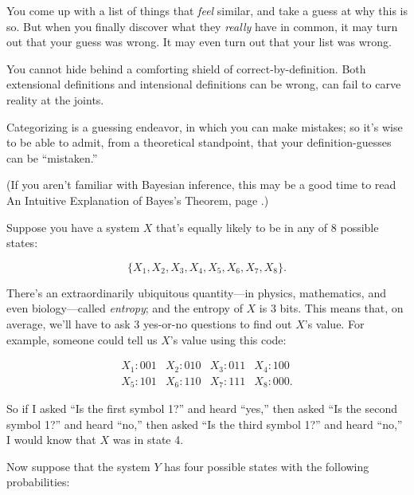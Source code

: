 {{{
 You come up with a list of things that \textit{feel} similar, and
take a guess at why this is so. But when you finally discover what they
\textit{really} have in common, it may turn out that your guess was
wrong. It may even turn out that your list was wrong.}

{
 You cannot hide behind a comforting shield of
correct-by-definition. Both extensional definitions and intensional
definitions can be wrong, can fail to carve reality at the joints.}

{
 Categorizing is a guessing endeavor, in which you can make
mistakes; so it's wise to be able to admit, from a
theoretical standpoint, that your definition-guesses can be
``mistaken.''}

\myendsectiontext


{
 (If you aren't familiar with Bayesian inference,
this may be a good time to read An Intuitive Explanation of
Bayes's Theorem, page \pageref{intuitive_bayesian}.) }

{
 Suppose you have a system $X$ that's equally likely
to be in any of 8 possible states:}

\begin{equation*}
\{X_{1},X_{2}, X_{3}, X_{4}, X_{5}, X_{6}, X_{7}, X_{8} \}.
\end{equation*}

{
 There's an extraordinarily ubiquitous
quantity---in physics, mathematics, and even biology---called
\textit{entropy}; and the entropy of $X$ is 3 bits. This means that, on
average, we'll have to ask 3 yes-or-no questions to
find out $X$'s value. For example, someone could tell us
$X$'s value using this code:}

\begin{equation*}
  \begin{array}{llll}
 X_{1} : 001 &  X_{2} : 010 &  X_{3} : 011 &  X_{4} : 100 \\
 X_{5} : 101 &  X_{6} : 110 &  X_{7} : 111 &  X_{8} : 000.
 \end{array}
\end{equation*}


\bigskip

{
 So if I asked ``Is the first symbol
1?'' and heard
``yes,'' then asked
``Is the second symbol 1?'' and
heard ``no,'' then asked
``Is the third symbol 1?'' and heard
``no,'' I would know that $X$ was in
state 4.}

{
 Now suppose that the system $Y$ has four possible states with the
following probabilities:}

}}
